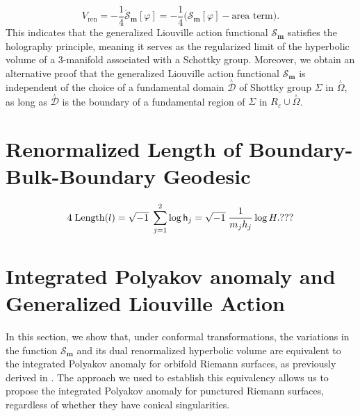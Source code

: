 \documentclass[a4paper,11pt]{article}
\newcommand{\Gpotential}{\mathscr{S}}
\newcommand{\Lponetial}{\mathsf{h}}
\newcommand{\singrigon}{\overset{{}_{\curlywedge}}{\Omega}}
\newcommand{\singfund}{\overset{{}_{\curlywedge}}{\mathcal{D}}}
\begin{document}
\begin{equation}
V_{\text{ren}} = -\frac{1}{4} \check{\mathscr{S}}_{\boldsymbol{m}}[\varphi]=-\frac{1}{4} \Big(\mathscr{S}_{\boldsymbol{m}}[\varphi]-\text{area term}\Big).\label{Theorem1}
\end{equation}
This indicates that the generalized Liouville action functional $\mathscr{S}_{\boldsymbol{m}}$  satisfies the holography principle, meaning it serves as the regularized limit of the hyperbolic volume of a 3-manifold associated with a Schottky group. Moreover, we obtain an alternative proof that the generalized Liouville action functional $\mathscr{S}_{\boldsymbol{m}}$ is independent of the choice of a fundamental domain $\singfund$ 
of Shottky group $\Sigma$ 
in $\singrigon$, as long as $\singfund$  is the boundary of a fundamental region of $\Sigma$ in 
$R_{\varepsilon}\cup \singrigon $.
\section{Renormalized Length of Boundary-Bulk-Boundary Geodesic}

\textcolor{red}{\begin{equation}
4 \hspace{1mm}\text{Length}(l) = \sqrt{-1} \hspace{1mm} \sum_{j=1}^{2} \log \Lponetial_{j} =\sqrt{-1}\hspace{1mm}\frac{1}{m_j h_j} \log H.  ???
\end{equation}}

\section{Integrated Polyakov anomaly and Generalized Liouville Action}\label{Section3}
In this section, we show that, under conformal transformations, the variations in the function $\Gpotential_{\boldsymbol{m}}$ and its dual renormalized hyperbolic volume are equivalent to the integrated Polyakov anomaly for orbifold Riemann surfaces, as previously derived in \cite{aldana2020polyakov}. The approach we used to establish this equivalency allows us to propose the integrated Polyakov anomaly for punctured Riemann surfaces, regardless of whether they have conical singularities.
\end{document}
